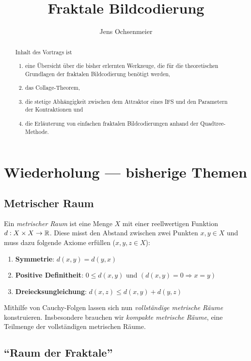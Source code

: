 \documentclass[afourpaper]{latex-classes/handout}
\title{Fraktale Bildcodierung}
\author{Jens Ochsenmeier}
\date{}
\begin{document}
\maketitle

\begin{abstract}
\noindent
  Inhalt des Vortrags ist
  \begin{enumerate}
    \item eine Übersicht über die bisher erlernten Werkzeuge, die für die theoretischen Grundlagen der fraktalen Bildcodierung benötigt werden,
    \item das Collage-Theorem,
    \item die stetige Abhängigkeit zwischen dem Attraktor eines IFS und den Parametern der Kontraktionen und
    \item die Erläuterung von einfachen fraktalen Bildcodierungen anhand der Quadtree-Methode.
  \end{enumerate}
\end{abstract}

\section{Wiederholung --- bisherige Themen}

\subsection{Metrischer Raum}

Ein \emph{metrischer Raum} ist eine Menge \( X \) mit einer reellwertigen Funktion \( d: X \times X \to \mathbb{R} \). Diese misst den Abstand zwischen zwei Punkten \( x,y \in X \) und muss dazu folgende Axiome erfüllen (\( x,y,z \in X \)):
\begin{enumerate}
  \item \textbf{Symmetrie}: \( d(x,y) = d(y,x) \)
  \item \textbf{Positive Definitheit}: \( 0 \leq d(x,y) \) und \( (d(x,y) = 0 \Rightarrow x = y) \)
  \item \textbf{Dreiecksungleichung}: \( d(x,z) \leq d(x,y) + d(y,z) \)
\end{enumerate}

Mithilfe von Cauchy-Folgen lassen sich nun \emph{vollständige metrische Räume} konstruieren. Insbesondere brauchen wir \emph{kompakte metrische Räume}, eine Teilmenge der vollständigen metrischen Räume.

\subsection{``Raum der Fraktale''}
\end{document}
